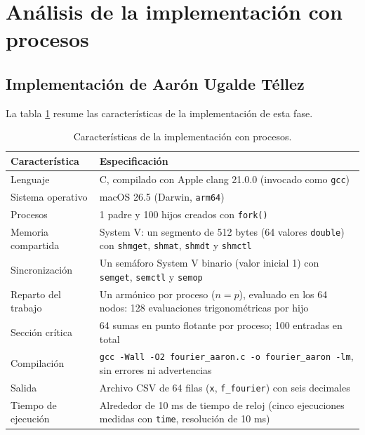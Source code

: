 \section{Análisis de la implementación con procesos}
\label{sec:cap03:analisis}

\subsection{Implementación de Aarón Ugalde Téllez}
\label{sec:cap03:aaron:implementacion}

La tabla \ref{tab:cap03:aaron:caracteristicas} resume las características de la implementación de esta fase.

\begin{table}[H]
    \centering
    \caption{Características de la implementación con procesos.}
    \label{tab:cap03:aaron:caracteristicas}
    \begin{tabular}{p{}p{}}
        \toprule
        \textbf{Característica} & \textbf{Especificación} \\
        \midrule
        Lenguaje & C, compilado con Apple clang 21.0.0 (invocado como \texttt{gcc}) \\
        Sistema operativo & macOS 26.5 (Darwin, \texttt{arm64}) \\
        Procesos & 1 padre y 100 hijos creados con \texttt{fork()} \\
        Memoria compartida & System V: un segmento de 512 bytes (64 valores \texttt{double}) con \texttt{shmget}, \texttt{shmat}, \texttt{shmdt} y \texttt{shmctl} \\
        Sincronización & Un semáforo System V binario (valor inicial 1) con \texttt{semget}, \texttt{semctl} y \texttt{semop} \\
        Reparto del trabajo & Un armónico por proceso ($n = p$), evaluado en los 64 nodos: 128 evaluaciones trigonométricas por hijo \\
        Sección crítica & 64 sumas en punto flotante por proceso; 100 entradas en total \\
        Compilación & \texttt{gcc -Wall -O2 fourier\_aaron.c -o fourier\_aaron -lm}, sin errores ni advertencias \\
        Salida & Archivo CSV de 64 filas (\texttt{x}, \texttt{f\_fourier}) con seis decimales \\
        Tiempo de ejecución & Alrededor de 10 ms de tiempo de reloj (cinco ejecuciones medidas con \texttt{time}, resolución de 10 ms) \\
        \bottomrule
    \end{tabular}
\end{table}

